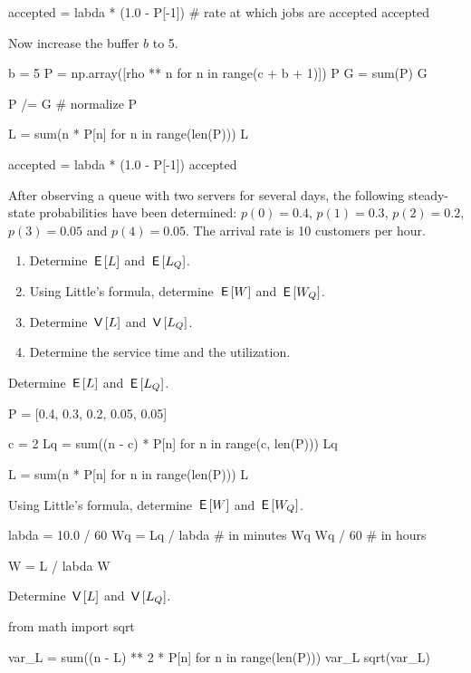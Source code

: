 \documentclass[companion]{subfiles}
\begin{document}
\begin{extra}
\begin{solution}
\begin{pyconsole}
accepted = labda * (1.0 - P[-1])  # rate at which jobs are accepted
accepted
\end{pyconsole} 

Now increase the buffer $b$ to 5.

\begin{pyconsole}
b = 5
P = np.array([rho ** n for n in range(c + b + 1)])
P
G = sum(P)
G

P /= G  # normalize
P

L = sum(n * P[n] for n in range(len(P)))
L

accepted = labda * (1.0 - P[-1])
accepted
\end{pyconsole} 
\end{solution}
\end{extra}

\begin{extra}[Hall 5.3] After observing a queue with two servers for several days, the following steady-state probabilities have been determined: $p(0)=0.4$, $p(1) = 0.3$, $p(2)=0.2$, $p(3)=0.05$ and $p(4)=0.05$.
 The arrival rate is 10 customers per hour.
 \begin{enumerate}
 \item Determine $\,\mathsf{E}\left[L\right]$ and $\,\mathsf{E}\left[L_Q\right]$. 
 \item Using Little's formula, determine $\,\mathsf{E}\left[W\right]$ and $\,\mathsf{E}\left[W_Q\right]$. 
 \item Determine $\,\mathsf{V}\left[L\right]$ and $\,\mathsf{V}\left[L_Q\right]$.
 \item Determine the service time and the utilization.
 \end{enumerate}
\begin{solution}
 Determine $\,\mathsf{E}\left[L\right]$ and $\,\mathsf{E}\left[L_Q\right]$. 

\begin{pyconsole}
P = [0.4, 0.3, 0.2, 0.05, 0.05]

c = 2
Lq = sum((n - c) * P[n] for n in range(c, len(P)))
Lq

L = sum(n * P[n] for n in range(len(P)))
L
\end{pyconsole}

 Using Little's formula, determine $\,\mathsf{E}\left[W\right]$ and $\,\mathsf{E}\left[W_Q\right]$. 
\begin{pyconsole}
labda = 10.0 / 60
Wq = Lq / labda  # in minutes
Wq
Wq / 60  # in hours

W = L / labda
W
\end{pyconsole} 

 Determine $\,\mathsf{V}\left[L\right]$ and $\,\mathsf{V}\left[L_Q\right]$.
\begin{pyconsole}
from math import sqrt

var_L = sum((n - L) ** 2 * P[n] for n in range(len(P)))
var_L
sqrt(var_L)
\end{pyconsole}


\end{solution}
\end{extra}
\end{document}
